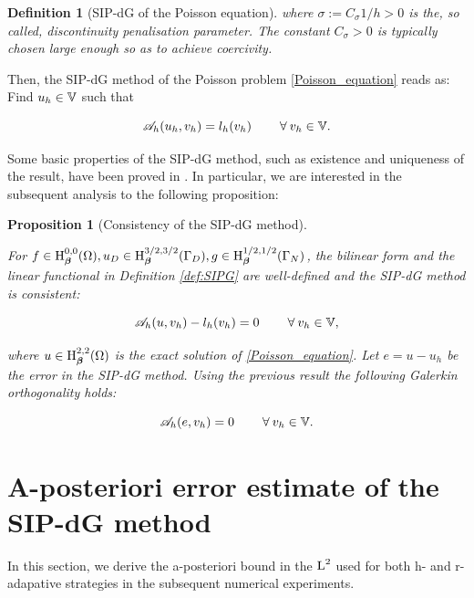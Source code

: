 \documentclass[a4paper,11pt]{article}
\newtheorem{definition}{Definition}[section]
\newtheorem{props}[theorem]{Proposition}
\begin{document}
{\begin{definition}[SIP-dG of the Poisson equation]
where $\sigma := C_{\sigma} 1/h > 0$ is the, so called, \textit{discontinuity penalisation parameter}. The constant $C_{\sigma} > 0$ is typically chosen large enough so as to achieve coercivity.

\end{definition}

Then, the SIP-dG method of the Poisson problem \eqref{Poisson_equation} reads as: Find $u_{h} \in \mathbb V$ such that

\begin{equation}
    \mathscr A_{h}(u_{h},v_{h}) = l_{h}(v_{h}) \quad \quad\:\forall\: v_{h} \in \mathbb V.
\label{eq:SIPDG_discrete}
\end{equation}

Some basic properties of the SIP-dG method, such as existence and uniqueness of the result, have been proved in \cite{Wihler:2003}. In particular, we are interested in the subsequent analysis to the following proposition: 

\begin{props}[Consistency of the SIP-dG method]\label{prop:consistency}

For $f \in \operatorname H^{0,0}_{\boldsymbol \beta}(\Omega), u_{D} \in \operatorname H^{3/2,3/2}_{\boldsymbol \beta}(\Gamma_{D}), g \in \operatorname H^{1/2,1/2}_{\boldsymbol \beta}(\Gamma_{N})$, the bilinear form and the linear functional in Definition \ref{def:SIPG} are well-defined and the SIP-dG method is consistent:

\begin{equation}
    \mathscr A_{h}(u,v_{h}) - l_{h}(v_{h}) = 0   \quad  \quad\:\forall\: v_{h} \in \mathbb V,
\label{eq:consistency}
\end{equation}

where $u \in \operatorname H^{2,2}_{\boldsymbol \beta}(\Omega)$ is the exact solution of \eqref{Poisson_equation}. Let $e = u - u_{h}$ be the error in the SIP-dG method. Using the previous result the following Galerkin orthogonality holds:

\begin{equation}
   \mathscr A_{h}(e,v_{h}) = 0 \quad \quad\:\forall\: v_{h} \in \mathbb V.
\label{Galerkin_orthogonality}
\end{equation}

\end{props}

\section{A-posteriori error estimate of the SIP-dG method}
\label{sec:a-posteriori}

In this section, we derive the a-posteriori bound in the $\operatorname L^{2}$ used for both h- and r-adapative strategies in the subsequent numerical experiments.    

}
\end{document}
